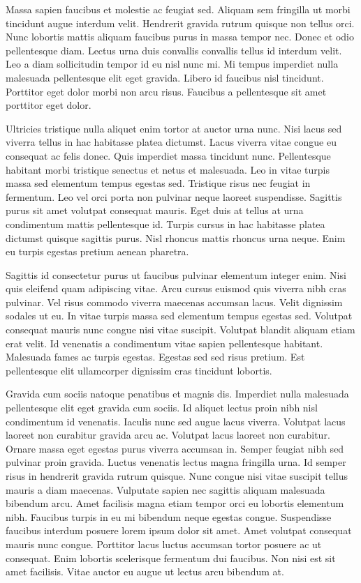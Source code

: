 \documentclass[11pt,a4paper]{article}
\begin{document}
Massa sapien faucibus et molestie ac feugiat sed. Aliquam sem fringilla ut morbi tincidunt augue interdum velit. Hendrerit gravida rutrum quisque non tellus orci. Nunc lobortis mattis aliquam faucibus purus in massa tempor nec. Donec et odio pellentesque diam. Lectus urna duis convallis convallis tellus id interdum velit. Leo a diam sollicitudin tempor id eu nisl nunc mi. Mi tempus imperdiet nulla malesuada pellentesque elit eget gravida. Libero id faucibus nisl tincidunt. Porttitor eget dolor morbi non arcu risus. Faucibus a pellentesque sit amet porttitor eget dolor.

Ultricies tristique nulla aliquet enim tortor at auctor urna nunc. Nisi lacus sed viverra tellus in hac habitasse platea dictumst. Lacus viverra vitae congue eu consequat ac felis donec. Quis imperdiet massa tincidunt nunc. Pellentesque habitant morbi tristique senectus et netus et malesuada. Leo in vitae turpis massa sed elementum tempus egestas sed. Tristique risus nec feugiat in fermentum. Leo vel orci porta non pulvinar neque laoreet suspendisse. Sagittis purus sit amet volutpat consequat mauris. Eget duis at tellus at urna condimentum mattis pellentesque id. Turpis cursus in hac habitasse platea dictumst quisque sagittis purus. Nisl rhoncus mattis rhoncus urna neque. Enim eu turpis egestas pretium aenean pharetra.

Sagittis id consectetur purus ut faucibus pulvinar elementum integer enim. Nisi quis eleifend quam adipiscing vitae. Arcu cursus euismod quis viverra nibh cras pulvinar. Vel risus commodo viverra maecenas accumsan lacus. Velit dignissim sodales ut eu. In vitae turpis massa sed elementum tempus egestas sed. Volutpat consequat mauris nunc congue nisi vitae suscipit. Volutpat blandit aliquam etiam erat velit. Id venenatis a condimentum vitae sapien pellentesque habitant. Malesuada fames ac turpis egestas. Egestas sed sed risus pretium. Est pellentesque elit ullamcorper dignissim cras tincidunt lobortis.

Gravida cum sociis natoque penatibus et magnis dis. Imperdiet nulla malesuada pellentesque elit eget gravida cum sociis. Id aliquet lectus proin nibh nisl condimentum id venenatis. Iaculis nunc sed augue lacus viverra. Volutpat lacus laoreet non curabitur gravida arcu ac. Volutpat lacus laoreet non curabitur. Ornare massa eget egestas purus viverra accumsan in. Semper feugiat nibh sed pulvinar proin gravida. Luctus venenatis lectus magna fringilla urna. Id semper risus in hendrerit gravida rutrum quisque. Nunc congue nisi vitae suscipit tellus mauris a diam maecenas. Vulputate sapien nec sagittis aliquam malesuada bibendum arcu. Amet facilisis magna etiam tempor orci eu lobortis elementum nibh. Faucibus turpis in eu mi bibendum neque egestas congue. Suspendisse faucibus interdum posuere lorem ipsum dolor sit amet. Amet volutpat consequat mauris nunc congue. Porttitor lacus luctus accumsan tortor posuere ac ut consequat. Enim lobortis scelerisque fermentum dui faucibus. Non nisi est sit amet facilisis. Vitae auctor eu augue ut lectus arcu bibendum at.
\end{document}
